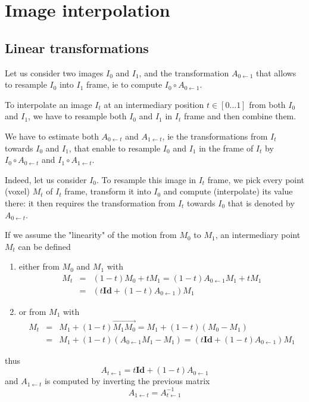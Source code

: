 %
%
%



\chapter{Image interpolation}

\section{Linear transformations}

Let us consider two images $I_0$ and $I_1$, and the transformation $A_{0 \leftarrow 1}$ that allows to resample $I_0$ into $I_1$ frame, ie to compute $I_0 \circ A_{0 \leftarrow 1}$.

To interpolate an image $I_t$ at an intermediary position $t \in [0 \ldots 1]$ from both $I_0$ and $I_1$, 
we have to resample both $I_0$ and $I_1$ in $I_t$ frame and then combine them.

We have to estimate both $A_{0\leftarrow t}$ and $A_{1\leftarrow t}$, ie the transformations from $I_t$ towards $I_0$ and $I_1$, that enable to resample $I_0$ and $I_1$ in the frame of $I_t$ by
$I_0 \circ A_{0\leftarrow t}$ and $I_1 \circ A_{1\leftarrow t}$.

Indeed, let us consider $I_0$. To resample this image in $I_t$ frame, we pick every point (voxel) $M_t$ of $I_t$ frame, transform it into $I_0$ and compute (interpolate) its value there: it then requires the transformation from $I_t$ towards $I_0$ that is denoted by $A_{0\leftarrow t}$.

If we assume the "linearity" of the motion from $M_0$ to $M_1$, an intermediary point $M_t$ can be defined 
\begin{enumerate}
\item either from $M_0$ and $M_1$ with
\begin{eqnarray*}
M_t & = & (1-t) M_0 + t M_1 
=  (1-t) A_{0\leftarrow 1} M_1 + t M_1 \\
& = & \left( t \mathbf{Id} + (1-t) A_{0 \leftarrow 1} \right) M_1
\end{eqnarray*}
\item or from $M_1$ with
\begin{eqnarray*}
M_t & = & M_1 + (1-t) \overrightarrow{M_1 M_0} 
= M_1 + (1-t) (M_0 - M_1) \\
& = & M_1 + (1-t) (A_{0\leftarrow 1} M_1 - M_1) 
= \left( t \mathbf{Id} + (1-t) A_{0 \leftarrow 1} \right) M_1
\end{eqnarray*}
\end{enumerate}
thus 
\begin{displaymath}
A_{t \leftarrow 1} = t \mathbf{Id} + (1-t) A_{0 \leftarrow 1} 
\end{displaymath}
and $A_{1 \leftarrow t}$ is computed by inverting the previous matrix
\begin{displaymath}
A_{1 \leftarrow t} = A_{t \leftarrow 1}^{-1} 
\end{displaymath}

